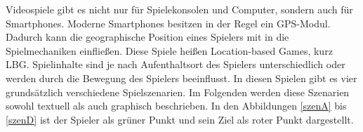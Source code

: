 
Videospiele gibt es nicht nur für Spielekonsolen und Computer, sondern auch für Smartphones. Moderne Smartphones besitzen in der Regel ein GPS-Modul. Dadurch kann die geographische Position eines Spielers mit in die Spielmechaniken einfließen. Diese Spiele heißen Location-based Games, kurz LBG. Spielinhalte sind je nach Aufenthaltsort des Spielers unterschiedlich oder werden durch die Bewegung des Spielers beeinflusst. In diesen Spielen gibt es vier grundsätzlich verschiedene Spielszenarien. Im Folgenden werden diese Szenarien sowohl textuell als auch graphisch beschrieben. 
In den Abbildungen \ref{szenA} bis \ref{szenD} ist der Spieler als grüner Punkt und sein Ziel als roter Punkt dargestellt. 

